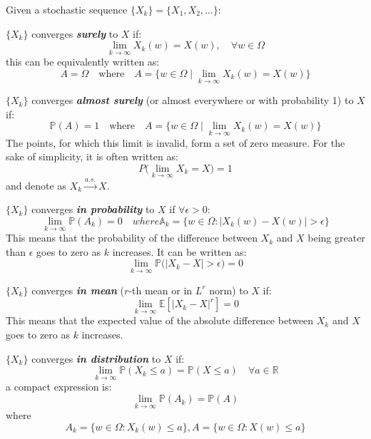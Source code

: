 \documentclass[10pt]{elegantbook}
\newcommand{\mydefination}[1]{\textbf{\textit{\textcolor{structurecolor}{#1}}}}
\begin{document}
Given a stochastic sequence $\{ X_k \} = \{ X_1, X_2, \ldots \}$:
\begin{definition}
    $\{ X_k \}$ converges \mydefination{surely} to $X$ if:
    \[ \lim_{k \rightarrow \infty} X_k(w) = X(w), \quad \forall w \in \Omega \]
    this can be equivalently written as:
    \[ A = \Omega \quad \text{where} \quad A = \{ w \in \Omega \mid \lim_{k \rightarrow \infty} X_k(w) = X(w) \} \]
\end{definition}

\begin{definition}
    $\{ X_k \}$ converges \mydefination{almost surely} (or almost everywhere or with probability 1) to $X$ if:
    \[ \mathbb P(A) = 1 \quad \text{where} \quad A = \{ w \in \Omega \mid \lim_{k \rightarrow \infty} X_k(w) = X(w) \} \]
    The points, for which this limit is invalid, form a set of zero measure. For the sake of simplicity, it is often written as:
    \[ P \big ( \lim_{k \rightarrow \infty} X_k = X \big ) = 1 \]
    and denote as $X_k \xrightarrow{a.s.} X$.
\end{definition}

\begin{definition}
    $\{ X_k \}$ converges \mydefination{in probability} to $X$ if $\forall \epsilon > 0$:
    \[ \lim_{k \rightarrow \infty} \mathbb P(A_k) = 0 \quad where  \mathbb A_k = \{ w \in \Omega : |X_k(w) - X(w)| > \epsilon \} \]
    This means that the probability of the difference between $X_k$ and $X$ being greater than $\epsilon$ goes to zero as $k$ increases.
    It can be written as:
    \[ \lim_{k \rightarrow \infty} \mathbb P \big ( |X_k - X| > \epsilon \big ) = 0 \]
\end{definition}

\begin{definition}
    $\{ X_k \}$ converges \mydefination{in mean} ($r$-th mean or in $L^r$ norm) to $X$ if:
    \[ \lim_{k \rightarrow \infty} \mathbb E[|X_k - X|^r] = 0 \]
    This means that the expected value of the absolute difference between $X_k$ and $X$ goes to zero as $k$ increases.
\end{definition}

\begin{definition}
    $\{ X_k \}$ converges \mydefination{in distribution} to $X$ if:
    \[ \lim_{k \rightarrow \infty} \mathbb P(X_k \leq a) = \mathbb P(X \leq a) \quad \forall a \in \mathbb R \]
    a compact expression is:
    \[ \lim_{k \rightarrow \infty} \mathbb P(A_k) = \mathbb P(A) \]
    where
    \[ A_k = \{ w \in \Omega : X_k(w) \leq a \}, A = \{ w \in \Omega : X(w) \leq a \} \]
\end{definition}
\end{document}
